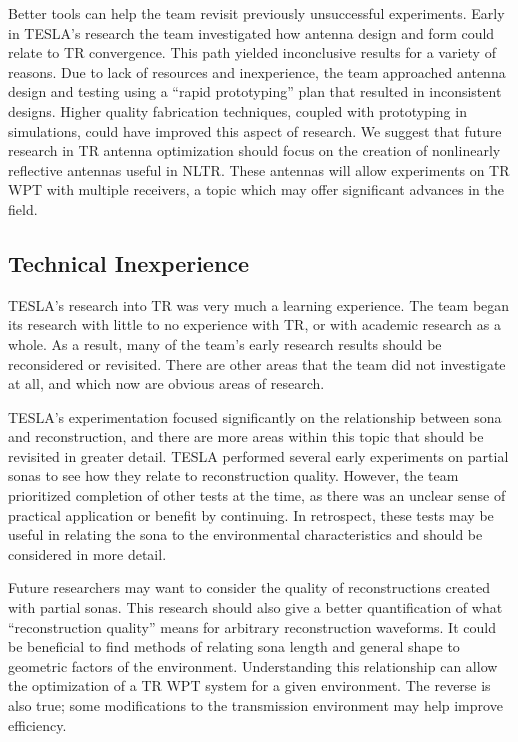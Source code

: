 Better tools can help the team revisit previously unsuccessful experiments. Early in TESLA’s research the team investigated how antenna design and form could relate to TR convergence.  This path yielded inconclusive results for a variety of reasons. Due to lack of resources and inexperience, the team approached antenna design and testing using a “rapid prototyping” plan that resulted in inconsistent designs. Higher quality fabrication techniques, coupled with prototyping in simulations, could have improved this aspect of research.  We suggest that future research in TR antenna optimization should focus on the creation of nonlinearly reflective antennas useful in NLTR.  These antennas will allow experiments on TR WPT with multiple receivers, a topic which may offer significant advances in the field.

\subsection{Technical Inexperience}

TESLA's research into TR was very much a learning experience.  The team began its research with little to no experience with TR, or with academic research as a whole.  As a result, many of the team's early research results should be reconsidered or revisited. There are other areas that the team did not investigate at all, and which now are obvious areas of research.

TESLA’s experimentation focused significantly on the relationship between sona and reconstruction, and there are more areas within this topic that should be revisited in greater detail.  TESLA performed several early experiments on partial sonas to see how they relate to reconstruction quality.  However, the team prioritized completion of other tests at the time, as there was an unclear sense of practical application or benefit by continuing.  In retrospect, these tests may be useful in relating the sona to the environmental characteristics and should be considered in more detail.

Future researchers may want to consider the quality of reconstructions created with partial sonas.  This research should also give a better quantification of what “reconstruction quality” means for arbitrary reconstruction waveforms. It could be beneficial to find methods of relating sona length and general shape to geometric factors of the environment. Understanding this relationship can allow the optimization of a TR WPT system for a given environment. The reverse is also true; some modifications to the transmission environment may help improve efficiency.

